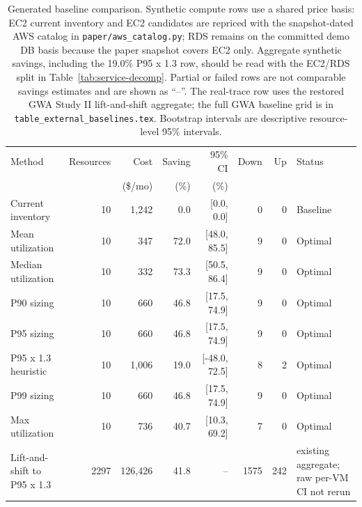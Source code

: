 \begin{table}[t]
\caption{Generated baseline comparison. Synthetic compute rows use a shared price basis: EC2 current inventory and EC2 candidates are repriced with the snapshot-dated AWS catalog in \texttt{paper/aws\_catalog.py}; RDS remains on the committed demo DB basis because the paper snapshot covers EC2 only. Aggregate synthetic savings, including the 19.0\% P95 x 1.3 row, should be read with the EC2/RDS split in Table~\ref{tab:service-decomp}. Partial or failed rows are not comparable savings estimates and are shown as ``--''. The real-trace row uses the restored GWA Study II lift-and-shift aggregate; the full GWA baseline grid is in \texttt{table\_external\_baselines.tex}. Bootstrap intervals are descriptive resource-level 95\% intervals.}
\label{tab:baselines}
\centering
\renewcommand{\arraystretch}{1.08}
\begin{tabular}{@{}l r r r r r r l@{}}
\toprule
Method & Resources & Cost & Saving & 95\% CI & Down & Up & Status \\
 & & (\$/mo) & (\%) & (\%) & & & \\
\midrule
Current inventory & 10 & 1,242 & 0.0 & [0.0, 0.0] & 0 & 0 & Baseline \\
Mean utilization & 10 & 347 & 72.0 & [48.0, 85.5] & 9 & 0 & Optimal \\
Median utilization & 10 & 332 & 73.3 & [50.5, 86.4] & 9 & 0 & Optimal \\
P90 sizing & 10 & 660 & 46.8 & [17.5, 74.9] & 9 & 0 & Optimal \\
P95 sizing & 10 & 660 & 46.8 & [17.5, 74.9] & 9 & 0 & Optimal \\
P95 x 1.3 heuristic & 10 & 1,006 & 19.0 & [-48.0, 72.5] & 8 & 2 & Optimal \\
P99 sizing & 10 & 660 & 46.8 & [17.5, 74.9] & 9 & 0 & Optimal \\
Max utilization & 10 & 736 & 40.7 & [10.3, 69.2] & 7 & 0 & Optimal \\
\midrule
Lift-and-shift to P95 x 1.3 & 2297 & 126,426 & 41.8 & -- & 1575 & 242 & existing aggregate; raw per-VM CI not rerun \\
\bottomrule
\end{tabular}
\end{table}
